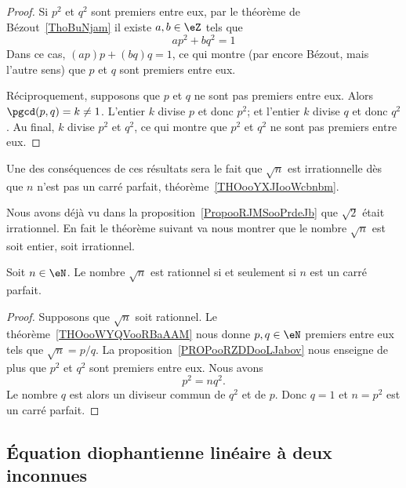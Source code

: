 \begin{proof}
    Si \( p^2\) et \( q^2\) sont premiers entre eux, par le théorème de Bézout~\ref{ThoBuNjam} il existe \( a,b\in \eZ\) tels que
    \begin{equation}
        ap^2+bq^2=1
    \end{equation}
    Dans ce cas, \( (ap)p+(bq)q=1\), ce qui montre (par encore Bézout, mais l'autre sens) que \( p\) et \( q\) sont premiers entre eux.

    Réciproquement, supposons que \( p\) et \( q\) ne sont pas premiers entre eux. Alors \( \pgcd(p,q)=k\neq 1\). L'entier \( k\) divise \( p\) et donc \( p^2\); et l'entier \( k\) divise \( q\) et donc \( q^2\). Au final, \( k\) divise \( p^2\) et \( q^2\), ce qui montre que \( p^2\) et \( q^2\) ne sont pas premiers entre eux.
\end{proof}

Une des conséquences de ces résultats sera le fait que \( \sqrt{n}\) est irrationnelle dès que \( n\) n'est pas un carré parfait, théorème~\ref{THOooYXJIooWcbnbm}.

Nous avons déjà vu dans la proposition~\ref{PropooRJMSooPrdeJb} que \( \sqrt{2}\) était irrationnel. En fait le théorème suivant va nous montrer que le nombre \( \sqrt{ n }\) est soit entier, soit irrationnel.
\begin{theorem}     \label{THOooYXJIooWcbnbm}
    Soit \( n\in \eN\). Le nombre \( \sqrt{n}\) est rationnel si et seulement si \( n\) est un carré parfait.
\end{theorem}

\begin{proof}
    Supposons que \( \sqrt{n}\) soit rationnel. Le théorème~\ref{THOooWYQVooRBaAAM} nous donne \( p,q\in \eN\) premiers entre eux tels que \( \sqrt{n}=p/q\). La proposition~\ref{PROPooRZDDooLJabov} nous enseigne de plus que \( p^2\) et \( q^2\) sont premiers entre eux. Nous avons
    \begin{equation}
        p^2=nq^2.
    \end{equation}
    Le nombre $q$ est alors un diviseur commun de \( q^2\) et de \( p\). Donc \( q=1\) et \( n=p^2\) est un carré parfait.
\end{proof}

\subsection{Équation diophantienne linéaire à deux inconnues}
\label{subsecZVKNooXNjPSf}

